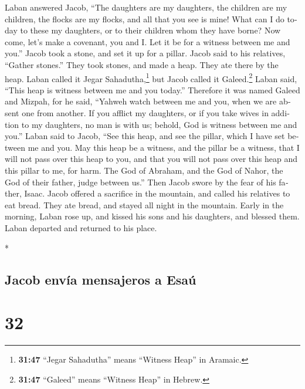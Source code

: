 \begin{paracol}{2}
\begin{otherlanguage}{english}
 Laban answered Jacob, ``The daughters are my daughters,
the children are my children, the flocks are my flocks, and all that you
see is mine! What can I do today to these my daughters, or to their
children whom they have borne?  Now come, let's make a
covenant, you and I. Let it be for a witness between me and you.''
 Jacob took a stone, and set it up for a pillar.
 Jacob said to his relatives, ``Gather stones.'' They
took stones, and made a heap. They ate there by the heap.
 Laban called it Jegar Sahadutha,\footnote{\textbf{31:47}
  ``Jegar Sahadutha'' means ``Witness Heap'' in Aramaic.} but Jacob
called it Galeed.\footnote{\textbf{31:47} ``Galeed'' means ``Witness
  Heap'' in Hebrew.}  Laban said, ``This heap is witness
between me and you today.'' Therefore it was named Galeed
 and Mizpah, for he said, ``Yahweh watch between me and
you, when we are absent one from another.  If you afflict
my daughters, or if you take wives in addition to my daughters, no man
is with us; behold, God is witness between me and you.'' 
Laban said to Jacob, ``See this heap, and see the pillar, which I have
set between me and you.  May this heap be a witness, and
the pillar be a witness, that I will not pass over this heap to you, and
that you will not pass over this heap and this pillar to me, for harm.
 The God of Abraham, and the God of Nahor, the God of
their father, judge between us.'' Then Jacob swore by the fear of his
father, Isaac.  Jacob offered a sacrifice in the
mountain, and called his relatives to eat bread. They ate bread, and
stayed all night in the mountain.  Early in the morning,
Laban rose up, and kissed his sons and his daughters, and blessed them.
Laban departed and returned to his place.

\end{otherlanguage}

\switchcolumn[0]*

\hypertarget{jacob-envuxeda-mensajeros-a-esauxfa}{%
\subsection{Jacob envía mensajeros a
Esaú}\label{jacob-envuxeda-mensajeros-a-esauxfa}}

\hypertarget{section-62}{%
\section{32}\label{section-62}}


\end{paracol}
